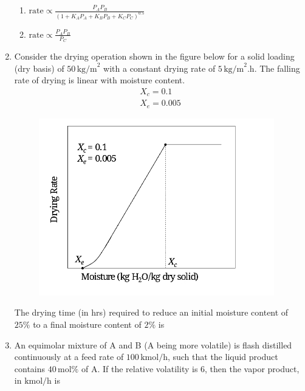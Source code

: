 \documentclass[journal,12pt,onecolumn]{IEEEtran}
\theoremstyle{remark}
\begin{document}
\begin{enumerate}
\begin{enumerate}
\item $\text{rate} \propto \frac{P_A P_B}{(1+K_A P_A + K_B P_B + K_C P_C)^{0.5}}$

\item $\text{rate} \propto \frac{P_A P_B}{P_C}$
\end{enumerate}

\item Consider the drying operation shown in the figure below for a solid loading (dry basis) of $50 \, \text{kg/m}^2$ with a constant drying rate of $5 \, \text{kg/m}^2.\text{h}$. The falling rate of drying is linear with moisture content.
\hfill{}
\[\begin{array}{c}X_c = 0.1 \\X_e = 0.005\end{array}\]
\begin{figure}[H]
    \centering
\includegraphics[width=0.3\columnwidth]{figs/qn 37.jpg}
    \caption{}
    \label{fig:qn.37.jpg}
\end{figure}

The drying time (in hrs) required to reduce an initial moisture content of $25\%$ to a final moisture content of $2\%$ is
\begin{enumerate}
\end{enumerate}

\item An equimolar mixture of A and B (A being more volatile) is flash distilled continuously at a feed rate of $100 \, \text{kmol/h}$, such that the liquid product contains $40 \, \text{mol} \%$ of A. If the relative volatility is $6$, then the vapor product, in $\text{kmol/h}$ is
\hfill{}
\begin{enumerate}
\end{enumerate}


\end{enumerate}
\end{document}
